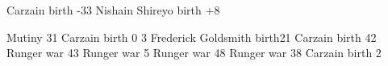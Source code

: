 \newcommand{\Shachar}    {Shachar\xspace}
\newcommand{\Shireyo}    {Shachar\xspace}
\newcommand{\MrShachar}  {\Mr{} \Shireyo}
\newcommand{\MrShireyo}  {\Mr{} \Shireyo}
\newcommand{\DaiShireyo} {\Dai\Shireyo}

\newcommand{\Roanne}   {Roanne\xspace}

\newcommand{\Deracil}   {\Deracille}
\newcommand{\Delishe}   {\Deracille}
\newcommand{\Deracille} {D\'er\^a\c cille\xspace}

\newcommand{\CarzainDeracilleShireyo} {Carzain \Deracille{} \Shireyo}
\newcommand{\CarzainShireyo}          {Carzain \Shireyo}
\newcommand{\CarzainShachar}          {Carzain \Shachar}

    {Carzain birth}            {-33}
   {Nishain Shireyo birth}    {+8}

\begin{comment}
\paragraph{Others}
\end{comment}

\newcommand{\Symeon}  {S\ydiphthong m\"eon{}\xspace} %
\newcommand{\Weylon}  {Weylon{}\xspace} %

             {Mutiny}                   {31}
  {Carzain birth}            {0}
  {3}
    {Frederick Goldsmith birth}{21}
            {Carzain birth}            {42}
      {Runger war}               {43}
       {Runger war}               {5}
       {Runger war}               {48}
             {Runger war}               {38}
      {Carzain birth}            {2}

\begin{comment}
\subsubsection{The Ishrah}
\end{comment}

\newcommand{\MoroCobrel}       {Moro Cobrel\xspace}
\newcommand{\Cobrel}           {Cobrel\xspace} %
\newcommand{\Cornel}           {Cobrel\xspace}
\newcommand{\MissCornel}       {\Miss Cobrel\xspace}

